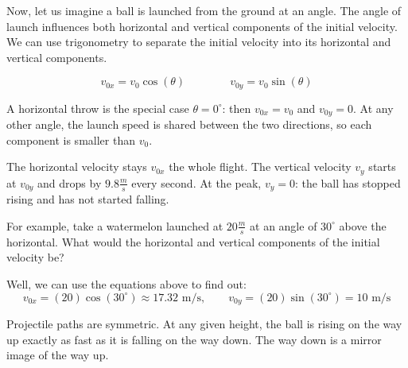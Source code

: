 Now, let us imagine a ball is launched from the ground at an angle.
The angle of launch influences both horizontal and vertical components of the initial velocity. 
We can use trigonometry to separate the initial velocity into its horizontal and vertical components.

\[            
v_{0x} = v_0 \cos(\theta) \qquad \qquad
v_{0y} = v_0 \sin(\theta) 
\]

A horizontal throw is the special case $\theta = 0^\circ$: then
$v_{0x} = v_0$ and $v_{0y} = 0$. At any other angle, the launch speed is
shared between the two directions, so each component is smaller than $v_0$.

The horizontal velocity stays $v_{0x}$ the whole flight. The vertical
velocity $v_y$ starts at $v_{0y}$ and drops by $9.8 \frac{m}{s}$ every
second. At the peak, $v_y = 0$: the ball has stopped rising and has not
started falling. 


\begin{center}
\end{center}

For example, take a watermelon launched at $20 \frac{m}{s}$ at an angle of $30^\circ$ above the horizontal. What would the horizontal and vertical components of the initial velocity be?

Well, we can use the equations above to find out:
$$
v_{0x} = (20) \cos(30^\circ) \approx 17.32 \text{ m/s}, \qquad v_{0y} = (20) \sin(30^\circ) = 10 \text{ m/s}
$$

Projectile paths are symmetric. At any given height, the
ball is rising on the way up exactly as fast as it is falling on the way
down. The way down is a mirror image of the way up.

